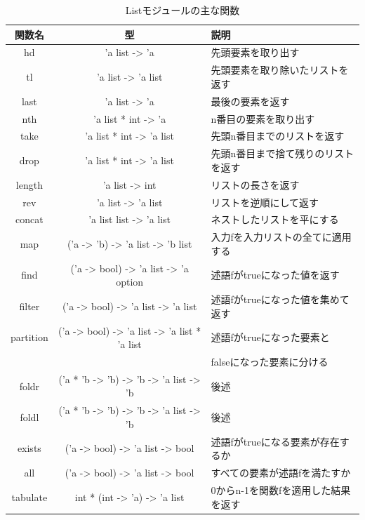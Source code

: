 \documentclass[11pt,a4paper]{article}
\begin{document}
\begin{table}[htbp]
  \begin{tabular}{|c|c|l|}
\hline
関数名 & 型 & 説明 \\ \hline \hline
hd & 'a list -> 'a                                         & 先頭要素を取り出す\\ \hline
tl & 'a list -> 'a list                                    & 先頭要素を取り除いたリストを返す\\ \hline
last & 'a list -> 'a                                       & 最後の要素を返す\\ \hline
nth & 'a list * int -> 'a                                  & n番目の要素を取り出す\\ \hline
take & 'a list * int -> 'a list                            & 先頭n番目までのリストを返す\\ \hline
drop & 'a list * int -> 'a list                            & 先頭n番目まで捨て残りのリストを返す\\ \hline
length & 'a list -> int                                    & リストの長さを返す\\ \hline
rev & 'a list -> 'a list                                   & リストを逆順にして返す\\ \hline
concat & 'a list list -> 'a list                           & ネストしたリストを平にする\\ \hline
map & ('a -> 'b) -> 'a list -> 'b list                     & 入力fを入力リストの全てに適用する\\ \hline
find & ('a -> bool) -> 'a list -> 'a option                & 述語fがtrueになった値を返す\\ \hline
filter & ('a -> bool) -> 'a list -> 'a list                & 述語fがtrueになった値を集めて返す\\ \hline
partition & ('a -> bool) -> 'a list -> 'a list * 'a list   & 述語fがtrueになった要素と\\
          &                                                & falseになった要素に分ける\\ \hline
foldr & ('a * 'b -> 'b) -> 'b -> 'a list -> 'b             & 後述\\ \hline
foldl & ('a * 'b -> 'b) -> 'b -> 'a list -> 'b             & 後述\\ \hline
exists & ('a -> bool) -> 'a list -> bool                   & 述語fがtrueになる要素が存在するか\\ \hline
all & ('a -> bool) -> 'a list -> bool                      & すべての要素が述語fを満たすか\\ \hline
tabulate & int * (int -> 'a) -> 'a list                    & 0からn-1を関数fを適用した結果を返す\\ \hline
  \end{tabular}
  \caption{Listモジュールの主な関数}
  \label{fig:list-table}
\end{table}
\end{document}
